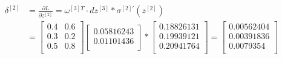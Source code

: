 \documentclass{article}
\begin{document}
\[
    \begin{aligned}
        \delta^{[2]} & = \frac{\partial L}{\partial z^{[2]}} = \omega^{[3]T}\cdot dz^{[3]}*\sigma^{[2]'}(z^{[2]}) \\
                     & = \begin{bmatrix}
                             0.4 & 0.6 \\
                             0.3 & 0.2 \\
                             0.5 & 0.8 \\
                         \end{bmatrix}
        \begin{bmatrix}
            0.05816243 \\
            0.01101436 \\
        \end{bmatrix}
        * \begin{bmatrix}
              0.18826131 \\
              0.19939121 \\
              0.20941764 \\
          \end{bmatrix}
        = \begin{bmatrix}
              0.00562404 \\
              0.00391836 \\
              0.0079354  \\
          \end{bmatrix}
    \end{aligned}
\]
\end{document}
